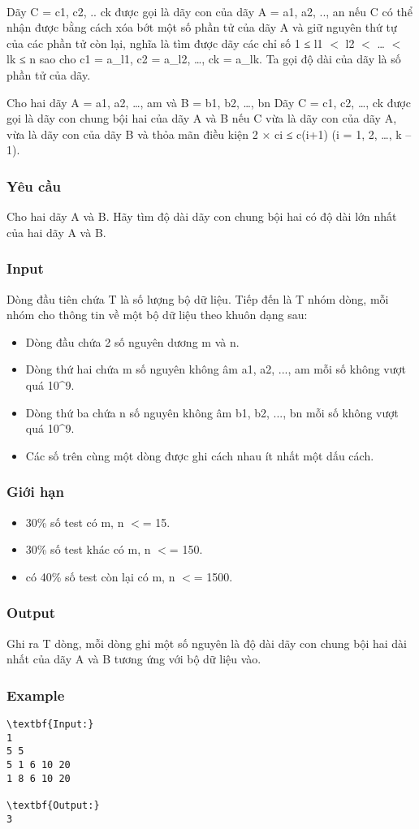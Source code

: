 

 

Dãy C = c1, c2, .. ck được gọi là dãy con của dãy A = a1, a2, .., an nếu C có thể nhận được bằng cách xóa bớt một số phần tử của dãy A và giữ nguyên thứ tự của các phần tử còn lại, nghĩa là tìm được dãy các chỉ số 1 ≤ l1 $<$ l2 $<$ … $<$ lk ≤ n sao cho c1 = a\_l1, c2 = a\_l2, …, ck = a\_lk. Ta gọi độ dài của dãy là số phần tử của dãy.

Cho hai dãy A = a1, a2, …, am và B = b1, b2, …, bn Dãy C = c1, c2, …, ck được gọi là dãy con chung bội hai của dãy A và B nếu C vừa là dãy con của dãy A, vừa là dãy con của dãy B và thỏa mãn điều kiện 2 × ci ≤ c(i+1) (i = 1, 2, …, k – 1).

\subsubsection{Yêu cầu}

Cho hai dãy A và B. Hãy tìm độ dài dãy con chung bội hai có độ dài lớn nhất của hai dãy A và B.

\subsubsection{Input}

Dòng đầu tiên chứa T là số lượng bộ dữ liệu. Tiếp đến là T nhóm dòng, mỗi nhóm cho thông tin về một bộ dữ liệu theo khuôn dạng sau:
\begin{itemize}
	\item Dòng đầu chứa 2 số nguyên dương m và n.
	\item Dòng thứ hai chứa m số nguyên không âm a1, a2, ..., am mỗi số không vượt quá 10\textasciicircum9.
	\item Dòng thứ ba chứa n số nguyên không âm b1, b2, ..., bn mỗi số không vượt quá 10\textasciicircum9.
	\item Các số trên cùng một dòng được ghi cách nhau ít nhất một dấu cách.
\end{itemize}

\subsubsection{Giới hạn}
\begin{itemize}
	\item 30\% số test có m, n $<$= 15.
	\item 30\% số test khác có m, n $<$= 150.
	\item có 40\% số test còn lại có m, n $<$= 1500.
\end{itemize}

\subsubsection{Output}

Ghi ra T dòng, mỗi dòng ghi một số nguyên là độ dài dãy con chung bội hai dài nhất của dãy A và B tương ứng với bộ dữ liệu vào.

\subsubsection{Example}
\begin{verbatim}
\textbf{Input:}
1
5 5
5 1 6 10 20
1 8 6 10 20

\textbf{Output:}
3
\end{verbatim}